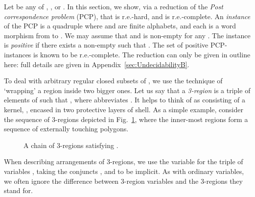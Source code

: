 \documentclass{article}
\begin{document}
Let  be any of , ,  or . In this
section, we show, via a reduction of the {\em Post correspondence
  problem} (PCP), that  is r.e.-hard, and
 is r.e.-complete. An {\em instance} of the PCP
is a quadruple  where  and  are
finite alphabets, and each  is a word morphism from  to
. We may assume that  and  is non-empty
for any . The instance  is {\em positive} if there
exists a non-empty  such that . The set
of positive PCP-instances is known to be r.e.-complete. The reduction
can only be given in outline here: full details are given in 
Appendix~\ref{sec:UndecidabilityB}.



To deal with arbitrary regular closed subsets of , we use
the technique of `wrapping' a region inside two bigger ones. Let us
say that a \emph{3-region} is a triple  of elements of  such that
, where 
abbreviates . It helps to think of  as consisting of a kernel,
, encased in two protective layers of shell. As a simple
example, consider the sequence of 3-regions  depicted in Fig.~\ref{fig:stack}, where the inner-most
regions form a sequence of externally touching polygons.
\begin{figure}[h]
\begin{center}
\end{center}
\vspace*{-2mm}
\caption{A chain of 3-regions satisfying .
}\label{fig:stack}
\end{figure}
When describing arrangements of 3-regions, we use the variable
 for the triple of variables , taking the conjuncts ,  and  to be implicit. As with
ordinary variables, we often ignore the difference between 3-region
variables and the 3-regions they stand for.
\end{document}
